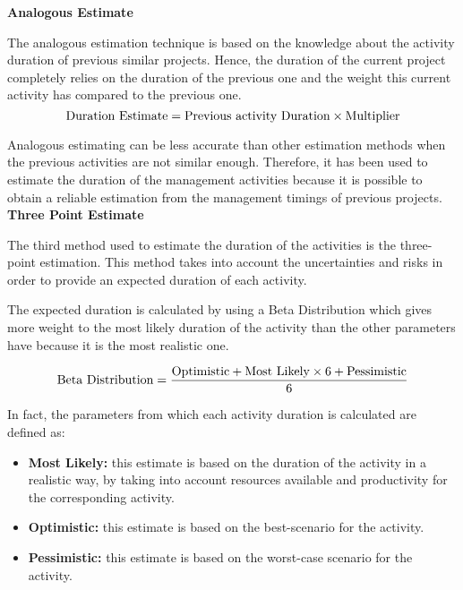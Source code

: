 \textbf{Analogous Estimate}

The analogous estimation technique is based on the knowledge about the activity duration of previous similar projects. Hence, the duration of the current project completely relies on the duration of the previous one and the weight this current activity has compared to the previous one. 
\begin{equation}
\centering
\notag \text{Duration Estimate}=\text{Previous activity Duration} \times \text{Multiplier}
\end{equation}

Analogous estimating can be less accurate than other estimation methods when the previous activities are not similar enough. Therefore, it has been used to estimate the duration of the management activities because it is possible to obtain a reliable estimation from the management timings of previous projects. \\

\textbf{Three Point Estimate}

The third method used to estimate the duration of the activities is the three-point estimation. This method takes into account the uncertainties and risks in order to provide an expected duration of each activity. 

The expected duration is calculated by using a Beta Distribution which gives more weight to the most likely duration of the activity than the other parameters have because it is the most realistic one.

\begin{equation}
\centering
\notag \text{Beta Distribution}=\frac{\text{Optimistic} + \text{Most Likely} \times 6 + \text{Pessimistic}}{6}
\end{equation}

In fact, the parameters from which each activity duration is calculated are defined as: 

\begin{itemize}

\item \textbf{Most Likely:} this estimate is based on the duration of the activity in a realistic way, by taking into account resources available and productivity for the corresponding activity. 

\item \textbf{Optimistic:} this estimate is based on the best-scenario for the activity. 

\item \textbf{Pessimistic:} this estimate is based on the worst-case scenario for the activity. 

\end{itemize}

